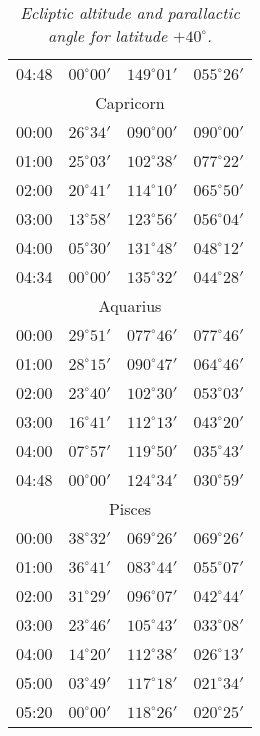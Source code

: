 \begin{table}
\begin{Parallel}{}{}
{{\begin{tabular}{l|lll}
04:48 & $00^\circ 00'$ & $149^\circ 01'$& $055^\circ 26'$ \\
\multicolumn{4}{c}{Capricorn}\\
00:00 & $26^\circ 34'$ & $090^\circ 00'$& $090^\circ 00'$ \\
01:00 & $25^\circ 03'$ & $102^\circ 38'$& $077^\circ 22'$ \\
02:00 & $20^\circ 41'$ & $114^\circ 10'$& $065^\circ 50'$ \\
03:00 & $13^\circ 58'$ & $123^\circ 56'$& $056^\circ 04'$ \\
04:00 & $05^\circ 30'$ & $131^\circ 48'$& $048^\circ 12'$ \\
04:34 & $00^\circ 00'$ & $135^\circ 32'$& $044^\circ 28'$ \\
\multicolumn{4}{c}{Aquarius}\\
00:00 & $29^\circ 51'$ & $077^\circ 46'$& $077^\circ 46'$ \\
01:00 & $28^\circ 15'$ & $090^\circ 47'$& $064^\circ 46'$ \\
02:00 & $23^\circ 40'$ & $102^\circ 30'$& $053^\circ 03'$ \\
03:00 & $16^\circ 41'$ & $112^\circ 13'$& $043^\circ 20'$ \\
04:00 & $07^\circ 57'$ & $119^\circ 50'$& $035^\circ 43'$ \\
04:48 & $00^\circ 00'$ & $124^\circ 34'$& $030^\circ 59'$ \\
\multicolumn{4}{c}{Pisces}\\
00:00 & $38^\circ 32'$ & $069^\circ 26'$& $069^\circ 26'$ \\
01:00 & $36^\circ 41'$ & $083^\circ 44'$& $055^\circ 07'$ \\
02:00 & $31^\circ 29'$ & $096^\circ 07'$& $042^\circ 44'$ \\
03:00 & $23^\circ 46'$ & $105^\circ 43'$& $033^\circ 08'$ \\
04:00 & $14^\circ 20'$ & $112^\circ 38'$& $026^\circ 13'$ \\
05:00 & $03^\circ 49'$ & $117^\circ 18'$& $021^\circ 34'$ \\
05:20 & $00^\circ 00'$ & $118^\circ 26'$& $020^\circ 25'$ \\
\end{tabular}
}}
\end{Parallel}
\caption{\em Ecliptic altitude and parallactic angle for latitude $+40^\circ$.}
\end{table}

